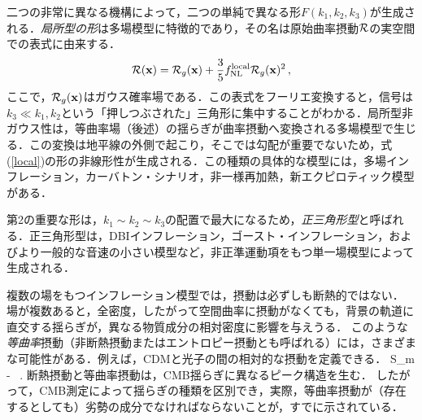 二つの非常に異なる機構によって，二つの単純で異なる形$F(k_1, k_2, k_3)$が生成される\cite{Babich_etal_04}．{\em 局所型の形}は多場模型に特徴的であり，その名は原始曲率摂動${\cal R}$の実空間での表式に由来する．
\begin{equation}
\label{local} {\cal R}({\bf x}) = {\cal R}_g({\bf x}) + \frac{3}{5} f_{\rm NL}^{\rm local} {\cal R}_g({\bf x})^2\, ,
\end{equation}
ここで，${\cal R}_g({\bf x})$はガウス確率場である．この表式をフーリエ変換すると，信号は$k_3 \ll k_1,k_2$という「押しつぶされた」三角形に集中することがわかる．局所型非ガウス性は，等曲率場（後述）の揺らぎが曲率摂動へ変換される多場模型で生じる．この変換は地平線の外側で起こり，そこでは勾配が重要でないため，式(\ref{local})の形の非線形性が生成される．この種類の具体的な模型には，多場インフレーション\cite{BMRmulti, Bernardeau:2002jy, Bernardeau:2002jf, Sasaki:2008uc, Naruko:2008sq, Byrnes:2008wi, Byrnes:2006fr, Langlois:2008vk, Valiviita:2008zb, Assadullahi:2007uw, Valiviita:2006mz, Vernizzi:2006ve, Allen:2005ye}，カーバトン・シナリオ\cite{Linde:1996gt, Lyth_etal03}，非一様再加熱\cite{Dvali:2003em, Kofman:2003nx}，新エクピロティック模型\cite{Creminelli:2007aq,Koyama_etal07,Buchbinder_etal07, Lehners:2007wc,Lehners:2008my, Koyama:2007ag, Koyama:2007mg}がある．

第2の重要な形は，$k_1 \sim k_2 \sim k_3$の配置で最大になるため，{\em 正三角形型}と呼ばれる．正三角形型は，DBIインフレーション\cite{Alishahiha:2004eh}，ゴースト・インフレーション\cite{GhostInflation,Senatore:2004rj}，およびより一般的な音速の小さい模型\cite{Creminelli:2003iq, Chen:2006nt}など，非正準運動項をもつ単一場模型によって生成される．

\label{sec:iso}

複数の場をもつインフレーション模型では，摂動は必ずしも断熱的ではない．
場が複数あると，全密度，したがって空間曲率に摂動がなくても，背景の軌道に直交する揺らぎが，異なる物質成分の相対密度に影響を与えうる\cite{Gordon:2000hv}．
このような{\it 等曲率}摂動（非断熱摂動またはエントロピー摂動とも呼ばれる）には，さまざまな可能性がある．例えば，CDMと光子の間の相対的な摂動を定義できる．
\beq
{\cal S}_m \equiv {} -  \frac{\delta \rho_\gamma}{\rho_\gamma}\, .
\eeq
断熱摂動と等曲率摂動は，CMB揺らぎに異なるピーク構造を生む．
したがって，CMB測定によって揺らぎの種類を区別でき，実際，等曲率摂動が（存在するとしても）劣勢の成分でなければならないことが，すでに示されている．

